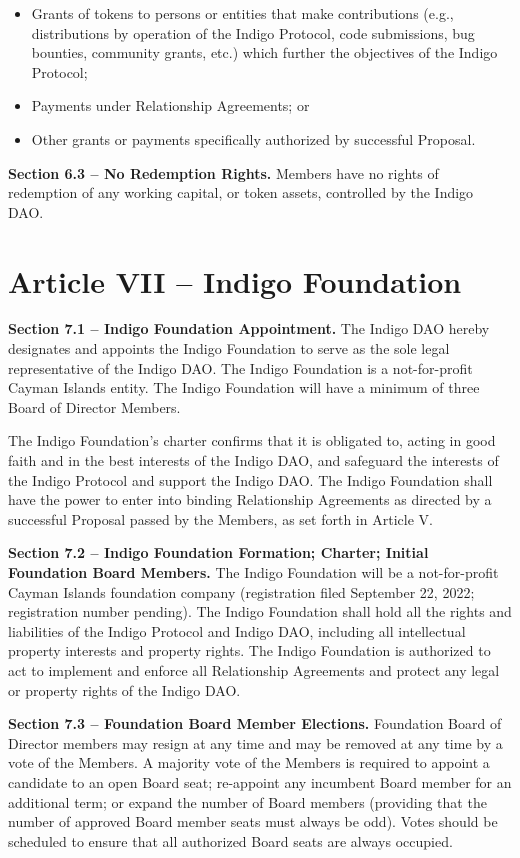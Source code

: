 \begin{itemize}
\item
  Grants of tokens to persons or entities that make contributions (e.g.,
  distributions by operation of the Indigo Protocol, code submissions,
  bug bounties, community grants, etc.) which further the objectives of
  the Indigo Protocol;
\item
  Payments under Relationship Agreements; or
\item
  Other grants or payments specifically authorized by successful
  Proposal.
\end{itemize}

\textbf{Section 6.3 -- No Redemption Rights.} Members have no rights of
redemption of any working capital, or token assets, controlled by the
Indigo DAO.

\hypertarget{article-vii-indigo-foundation}{%
\section{Article VII -- Indigo
Foundation}\label{article-vii-indigo-foundation}}

\textbf{Section 7.1 -- Indigo Foundation Appointment.} The Indigo DAO
hereby designates and appoints the Indigo Foundation to serve as the
sole legal representative of the Indigo DAO. The Indigo Foundation is a
not-for-profit Cayman Islands entity. The Indigo Foundation will have a
minimum of three Board of Director Members.

The Indigo Foundation's charter confirms that it is obligated to, acting
in good faith and in the best interests of the Indigo DAO, and safeguard
the interests of the Indigo Protocol and support the Indigo DAO. The
Indigo Foundation shall have the power to enter into binding
Relationship Agreements as directed by a successful Proposal passed by
the Members, as set forth in Article V.

\textbf{Section 7.2 -- Indigo Foundation Formation; Charter; Initial
Foundation Board Members.} The Indigo Foundation will be a
not-for-profit Cayman Islands foundation company (registration filed
September 22, 2022; registration number pending). The Indigo Foundation
shall hold all the rights and liabilities of the Indigo Protocol and
Indigo DAO, including all intellectual property interests and property
rights. The Indigo Foundation is authorized to act to implement and
enforce all Relationship Agreements and protect any legal or property
rights of the Indigo DAO.

\textbf{Section 7.3 -- Foundation Board Member Elections.} Foundation
Board of Director members may resign at any time and may be removed at
any time by a vote of the Members. A majority vote of the Members is
required to appoint a candidate to an open Board seat; re-appoint any
incumbent Board member for an additional term; or expand the number of
Board members (providing that the number of approved Board member seats
must always be odd). Votes should be scheduled to ensure that all
authorized Board seats are always occupied.

